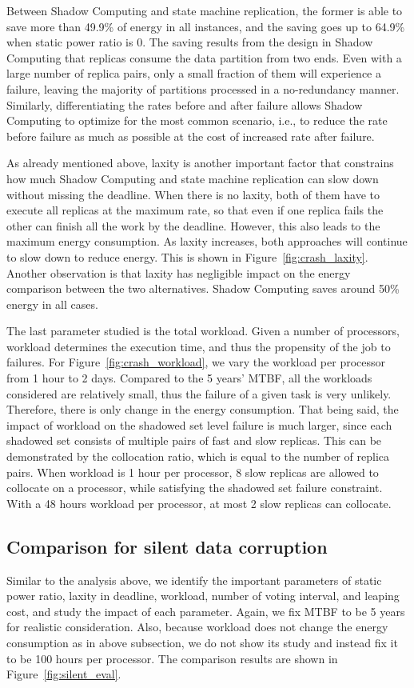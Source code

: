 Between Shadow Computing and state machine replication, the former is able to save more than 49.9\% of energy in all instances, and the saving goes up to 64.9\% when static power ratio is 0. The saving results from the design in Shadow Computing that replicas consume the data partition from two ends. Even with a large number of replica pairs, only a small fraction of them will experience a failure, leaving the majority of partitions processed in a no-redundancy manner. Similarly, differentiating the rates before and after failure allows Shadow Computing to optimize for the most common scenario, i.e., to reduce the rate before failure as much as possible at the cost of increased rate after failure.

As already mentioned above, laxity is another important factor that constrains how much Shadow Computing and state machine replication can slow down without missing the deadline. When there is no laxity, both of them have to execute all replicas at the maximum rate, so that even if one replica fails the other can finish all the work by the deadline. However, this also leads to the maximum energy consumption. As laxity increases, both approaches will continue to slow down to reduce energy. %
This is shown in Figure~\ref{fig:crash_laxity}. Another observation is that laxity has negligible impact on the energy comparison between the two alternatives. Shadow Computing saves around 50\% energy in all cases. 

The last parameter studied is the total workload. Given a number of processors, workload determines the execution time, and thus the propensity of the job to failures. For Figure~\ref{fig:crash_workload}, we vary the workload per processor from 1 hour to 2 days. Compared to the 5 years' MTBF, all the workloads considered are relatively small, thus the failure of a given task is very unlikely. Therefore, there is only change in the energy consumption. That being said, the impact of workload on the shadowed set level failure is much larger, since each shadowed set consists of multiple pairs of fast and slow replicas. This can be demonstrated by the collocation ratio, which is equal to the number of replica pairs. When workload is 1 hour per processor, 8 slow replicas are allowed to collocate on a processor, while satisfying the shadowed set failure constraint. With a 48 hours workload per processor, at most 2 slow replicas can collocate. 

\subsection{Comparison for silent data corruption}
Similar to the analysis above, we identify the important parameters of static power ratio, laxity in deadline, workload, number of voting interval, and leaping cost, and study the impact of each parameter. Again, we fix MTBF to be 5 years for realistic consideration. Also, because workload does not change the energy consumption as in above subsection, we do not show its study and instead fix it to be 100 hours per processor. The comparison results are shown in Figure~\ref{fig:silent_eval}.

